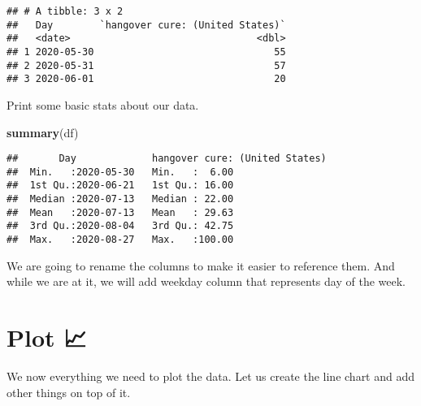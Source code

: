 \documentclass[]{article}
\newenvironment{Shaded}{\begin{snugshade}}{\end{snugshade}}
\newcommand{\KeywordTok}[1]{\textcolor[rgb]{0.13,0.29,0.53}{\textbf{#1}}}
\newcommand{\StringTok}[1]{\textcolor[rgb]{0.31,0.60,0.02}{#1}}
\newcommand{\OperatorTok}[1]{\textcolor[rgb]{0.81,0.36,0.00}{\textbf{#1}}}
\newcommand{\NormalTok}[1]{#1}
\begin{document}
\begin{verbatim}
## # A tibble: 3 x 2
##   Day        `hangover cure: (United States)`
##   <date>                                <dbl>
## 1 2020-05-30                               55
## 2 2020-05-31                               57
## 3 2020-06-01                               20
\end{verbatim}

Print some basic stats about our data.

\begin{Shaded}
\begin{Highlighting}[]
\KeywordTok{summary}\NormalTok{(df)}
\end{Highlighting}
\end{Shaded}

\begin{verbatim}
##       Day             hangover cure: (United States)
##  Min.   :2020-05-30   Min.   :  6.00                
##  1st Qu.:2020-06-21   1st Qu.: 16.00                
##  Median :2020-07-13   Median : 22.00                
##  Mean   :2020-07-13   Mean   : 29.63                
##  3rd Qu.:2020-08-04   3rd Qu.: 42.75                
##  Max.   :2020-08-27   Max.   :100.00
\end{verbatim}

We are going to rename the columns to make it easier to reference them.
And while we are at it, we will add weekday column that represents day
of the week.

\begin{Shaded}
\end{Shaded}

\section{Plot 📈}\label{plot}

We now everything we need to plot the data. Let us create the line chart
and add other things on top of it.
\end{document}
